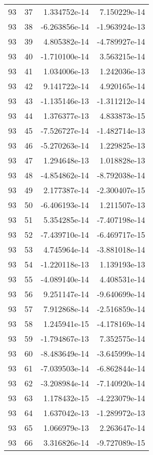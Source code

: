 \begin{tabular}{rrrr}
  93 &   37 &  1.334752e-14 &  7.150229e-14 \\
  93 &   38 & -6.263856e-14 & -1.963924e-13 \\
  93 &   39 &  4.805382e-14 & -4.789927e-14 \\
  93 &   40 & -1.710100e-14 &  3.563215e-14 \\
  93 &   41 &  1.034006e-13 &  1.242036e-13 \\
  93 &   42 &  9.141722e-14 &  4.920165e-14 \\
  93 &   43 & -1.135146e-13 & -1.311212e-14 \\
  93 &   44 &  1.376377e-13 &  4.833873e-15 \\
  93 &   45 & -7.526727e-14 & -1.482714e-13 \\
  93 &   46 & -5.270263e-14 &  1.229825e-13 \\
  93 &   47 &  1.294648e-13 &  1.018828e-13 \\
  93 &   48 & -4.854862e-14 & -8.792038e-14 \\
  93 &   49 &  2.177387e-14 & -2.300407e-15 \\
  93 &   50 & -6.406193e-14 &  1.211507e-13 \\
  93 &   51 &  5.354285e-14 & -7.407198e-14 \\
  93 &   52 & -7.439710e-14 & -6.469717e-15 \\
  93 &   53 &  4.745964e-14 & -3.881018e-14 \\
  93 &   54 & -1.220118e-13 &  1.139193e-13 \\
  93 &   55 & -4.089140e-14 &  4.408531e-14 \\
  93 &   56 &  9.251147e-14 & -9.640699e-14 \\
  93 &   57 &  7.912868e-14 & -2.516859e-14 \\
  93 &   58 &  1.245941e-15 & -4.178169e-14 \\
  93 &   59 & -1.794867e-13 &  7.352575e-14 \\
  93 &   60 & -8.483649e-14 & -3.645999e-14 \\
  93 &   61 & -7.039503e-14 & -6.862844e-14 \\
  93 &   62 & -3.208984e-14 & -7.140920e-14 \\
  93 &   63 &  1.178432e-15 & -4.223079e-14 \\
  93 &   64 &  1.637042e-13 & -1.289972e-13 \\
  93 &   65 &  1.066979e-13 &  2.263647e-14 \\
  93 &   66 &  3.316826e-14 & -9.727089e-15 \\

\end{tabular}
